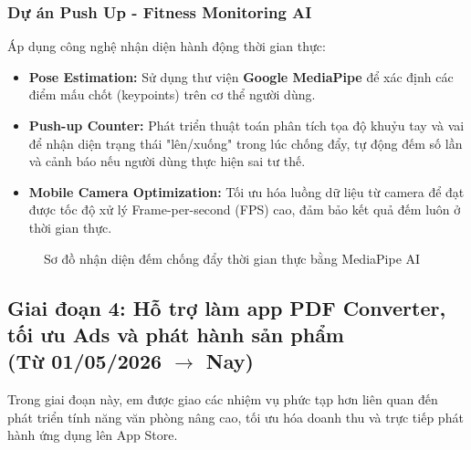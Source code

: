 \documentclass[12pt, a4paper]{article}
\begin{document}
\subsubsection{Dự án Push Up - Fitness Monitoring AI}
Áp dụng công nghệ nhận diện hành động thời gian thực:
\begin{itemize}
    \item \textbf{Pose Estimation:} Sử dụng thư viện \textbf{Google MediaPipe} để xác định các điểm mấu chốt (keypoints) trên cơ thể người dùng.
    \item \textbf{Push-up Counter:} Phát triển thuật toán phân tích tọa độ khuỷu tay và vai để nhận diện trạng thái "lên/xuống" trong lúc chống đẩy, tự động đếm số lần và cảnh báo nếu người dùng thực hiện sai tư thế.
    \item \textbf{Mobile Camera Optimization:} Tối ưu hóa luồng dữ liệu từ camera để đạt được tốc độ xử lý Frame-per-second (FPS) cao, đảm bảo kết quả đếm luôn ở thời gian thực.
\end{itemize}

\begin{figure}[htbp]
\centering
{}
\caption{Sơ đồ nhận diện đếm chống đẩy thời gian thực bằng MediaPipe AI}
\label{fig:pushup_flow}
\end{figure}

\subsection[Giai đoạn 4: Hỗ trợ làm app PDF Converter, tối ưu Ads và phát hành sản phẩm (Từ 01/05/2026 đến nay)]{Giai đoạn 4: Hỗ trợ làm app PDF Converter, tối ưu Ads và phát hành sản phẩm \\(Từ 01/05/2026 $\rightarrow$ Nay)}
Trong giai đoạn này, em được giao các nhiệm vụ phức tạp hơn liên quan đến phát triển tính năng văn phòng nâng cao, tối ưu hóa doanh thu và trực tiếp phát hành ứng dụng lên App Store.
\end{document}
